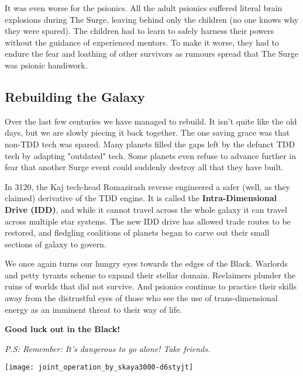 \begin{multicols}{2}
  It was even worse for the psionics. All the adult psionics suffered literal brain explosions during The Surge, leaving behind only the children (no one knows why they were spared). The children had to learn to safely harness their powers without the guidance of experienced mentors. To make it worse, they had to endure the fear and loathing of other survivors as rumours spread that The Surge was psionic handiwork.
  
  \subsection{Rebuilding the Galaxy}

  Over the last few centuries we have managed to rebuild. It isn't quite like the old days, but we are slowly piecing it back together. The one saving grace was that non-TDD tech was spared. Many planets filled the gaps left by the defunct TDD tech by adapting "outdated" tech. Some planets even refuse to advance further in fear that another Surge event could suddenly destroy all that they have built.
  
  In 3120, the Kaj tech-head Romazirash reverse engineered a safer (well, as they claimed) derivative of the TDD engine. It is called the \textbf{Intra-Dimensional Drive (IDD)}, and while it cannot travel across the whole galaxy it can travel across multiple star systems. The new IDD drive has allowed trade routes to be restored, and fledgling coalitions of planets began to carve out their small sections of galaxy to govern. 
  
  We once again turns our hungry eyes towards the edges of the Black. Warlords and petty tyrants scheme to expand their stellar domain. Reclaimers plunder the ruins of worlds that did not survive. And psionics continue to practice their skills away from the distrustful eyes of those who see the use of trans-dimensional energy as an imminent threat to their way of life.

  \textbf{Good luck out in the Black!}
  
  \textit{P.S: Remember: It's dangerous to go alone! Take friends.}
\end{multicols}

\vspace{\baselineskip}

\texttt{[image: joint\_operation\_by\_skaya3000-d6styjt]}
